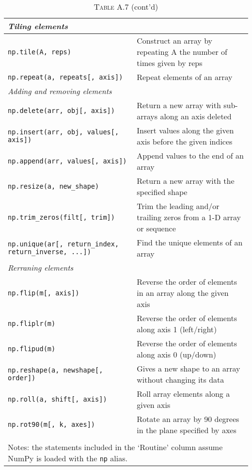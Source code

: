 \documentclass[a4paper,11pt]{book}
\numberwithin{figure}{chapter}
\numberwithin{table}{chapter}
\begin{document}
\begin{appendices}
\begin{table}
	\caption*{\textsc{Table A.7} (cont'd)}
	\begin{tabular}{p{7.5cm}p{8.5cm}}
		\midrule
		\multicolumn{1}{l}{\textit{Tiling elements}} \\ 
		\midrule
		\texttt{np.tile(A, reps)} & 
                Construct an array by repeating A the number of times given by reps\\
                \texttt{np.repeat(a, repeats[, axis])} & 
                Repeat elements of an array\\
		\midrule
		\multicolumn{1}{l}{\textit{Adding and removing elements}} \\
		\midrule
		\texttt{np.delete(arr, obj[, axis])} &
                Return a new array with sub-arrays along an axis deleted\\
                \texttt{np.insert(arr, obj, values[, axis])} &
                Insert values along the given axis before the given indices\\
               \texttt{np.append(arr, values[, axis])} &
                Append values to the end of an array\\
                \texttt{np.resize(a, new\_shape)} &
                Return a new array with the specified shape\\
                \texttt{np.trim\_zeros(filt[, trim])} &
                Trim the leading and/or trailing zeros from a 1-D array or sequence\\
                \texttt{np.unique(ar[, return\_index, return\_inverse, ...])} &
                Find the unique elements of an array\\
		\midrule
		\multicolumn{1}{l}{\textit{Rerraning elements}} \\
         	\midrule
		\texttt{np.flip(m[, axis])} &
                Reverse the order of elements in an array along the given axis\\
                \texttt{np.fliplr(m)} &
                Reverse the order of elements along axis 1 (left/right)\\
                \texttt{np.flipud(m)} &
                Reverse the order of elements along axis 0 (up/down)\\
                \texttt{np.reshape(a, newshape[, order])} &
                Gives a new shape to an array without changing its data\\
                \texttt{np.roll(a, shift[, axis])} &
                Roll array elements along a given axis\\
                \texttt{np.rot90(m[, k, axes])} &
                Rotate an array by 90 degrees in the plane specified by axes\\
		\bottomrule \\[-1.8ex]
	        \multicolumn{2}{l}{Notes: the statements included in the `Routine' column assume NumPy is loaded with the \texttt{np} alias.} \\
	\end{tabular}
\end{table}


\end{appendices}
\end{document}
